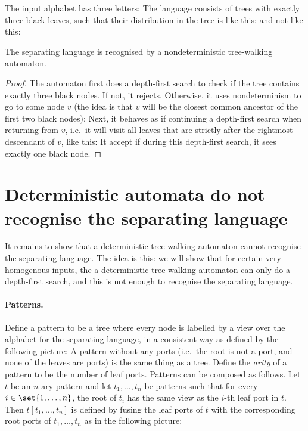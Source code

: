 The input alphabet has three letters:
The language consists of trees with exactly three black leaves, such that  their distribution in the tree is like this: 
and not like this:
\begin{lemma}\label{lem:ntwa}
The separating language is recognised by a nondeterministic tree-walking automaton.
\end{lemma}
\begin{proof}
The automaton first does a depth-first search to check if the tree contains exactly three black nodes. If not, it rejects. Otherwise, it uses nondeterminism to go to some node $v$ (the idea is that $v$ will be the closest common ancestor of the first two black nodes):
Next, it behaves as if continuing a depth-first search when returning from $v$, i.e.~it will visit all leaves that are strictly after the rightmost descendant of $v$, like this:
It accept if during this depth-first search, it sees exactly one black node. 
\end{proof}


\section{Deterministic  automata do not recognise the separating language}
It remains to show that a deterministic tree-walking automaton cannot recognise the separating language. The idea is this: we will show that for certain very homogenous inputs, the a deterministic tree-walking automaton can only do a depth-first search, and this is not enough to recognise the separating language.

\paragraph*{Patterns.} Define a pattern to be a tree where every node is labelled by a view over the alphabet for the separating language, in a consistent way as defined by the following picture:
A pattern without any ports (i.e.~the root is not a port, and none of the leaves are ports) is the same thing as a tree.  Define the \emph{arity} of a pattern to be the number of leaf ports. Patterns can be composed as follows. Let $t$ be an $n$-ary pattern and let  $t_1,\ldots,t_n$ be patterns such that for every  $i \in \set{1,\ldots,n}$, the root of $t_i$  has the  same view as the $i$-th leaf port in $t$. Then $t[t_1,\ldots,t_n]$ is defined by fusing the leaf ports of $t$ with the corresponding root ports of $t_1,\ldots,t_n$  as in the following picture:

